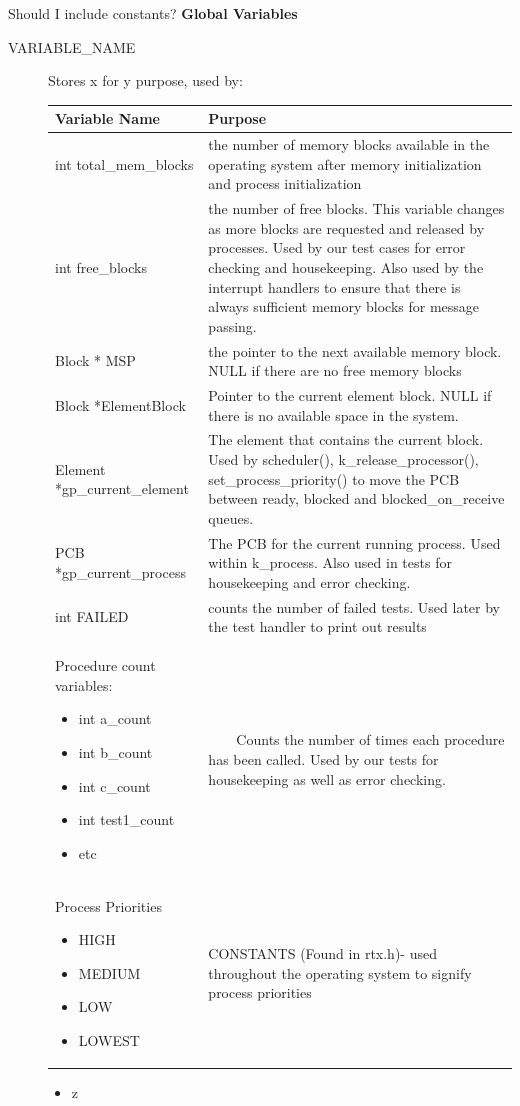 \documentclass[11pt, oneside]{article}
\newcommand{\tabitem}{~~\llap{\textbullet}~~}
\begin{document}
Should I include constants? 
{\bf Global Variables}
\begin{description}
\item [VARIABLE\_NAME] Stores x for y purpose, used by:
\newline
\begin{longtable}{|L{5cm}|L{8cm}|} \hline
\textbf{Variable Name} & \textbf{Purpose} \\ \hline
int total\_mem\_blocks & the number of memory blocks available in the operating system after memory initialization and process initialization \\ \hline
int free\_blocks & the number of free blocks. This variable changes as more blocks are requested and released by processes. Used by our test cases for error checking and housekeeping. Also used by the interrupt handlers to ensure that there is always sufficient memory blocks for message passing. \\ \hline
Block * MSP & the pointer to the next available memory block. NULL if there are no free memory blocks \\ \hline
Block *ElementBlock & Pointer to the current element block. NULL if there is no available space in the system. \\ \hline
Element *gp\_current\_element & The element that contains the current block. Used by scheduler(), k\_release\_processor(), set\_process\_priority() to move the PCB between ready, blocked and blocked\_on\_receive queues. \\ \hline
PCB *gp\_current\_process & The PCB for the current running process. Used within k\_process. Also used in tests for housekeeping and error checking. \\ \hline
int FAILED & counts the number of failed tests. Used later by the test handler to print out results \\ \hline
Procedure count variables:
\begin{itemize}
\item int a\_count
\item int b\_count
\item int c\_count
\item int test1\_count
\item etc
\end{itemize} & \tabitem Counts the number of times each procedure has been called. Used by our tests for housekeeping as well as error checking. \\ \hline

Process Priorities 
\begin{itemize}
\item HIGH
\item MEDIUM
\item LOW
\item LOWEST
\end{itemize}
& CONSTANTS (Found in rtx.h)- used throughout the operating system to signify process priorities\\ \hline

\end{longtable}
\begin{itemize}
\item z
\end{itemize}
\end{description}
\end{document}
